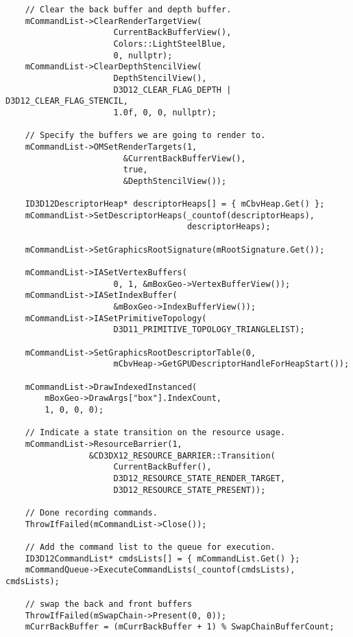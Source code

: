 \begin{lstlisting}
    // Clear the back buffer and depth buffer.
    mCommandList->ClearRenderTargetView(
                      CurrentBackBufferView(), 
                      Colors::LightSteelBlue, 
                      0, nullptr);
    mCommandList->ClearDepthStencilView(
                      DepthStencilView(), 
                      D3D12_CLEAR_FLAG_DEPTH | D3D12_CLEAR_FLAG_STENCIL, 
                      1.0f, 0, 0, nullptr);
    
    // Specify the buffers we are going to render to.
    mCommandList->OMSetRenderTargets(1, 
                        &CurrentBackBufferView(), 
                        true, 
                        &DepthStencilView());

    ID3D12DescriptorHeap* descriptorHeaps[] = { mCbvHeap.Get() };
    mCommandList->SetDescriptorHeaps(_countof(descriptorHeaps), 
                                     descriptorHeaps);

    mCommandList->SetGraphicsRootSignature(mRootSignature.Get());

    mCommandList->IASetVertexBuffers(
                      0, 1, &mBoxGeo->VertexBufferView());
    mCommandList->IASetIndexBuffer(
                      &mBoxGeo->IndexBufferView());
    mCommandList->IASetPrimitiveTopology(
                      D3D11_PRIMITIVE_TOPOLOGY_TRIANGLELIST);
    
    mCommandList->SetGraphicsRootDescriptorTable(0, 
                      mCbvHeap->GetGPUDescriptorHandleForHeapStart());

    mCommandList->DrawIndexedInstanced(
        mBoxGeo->DrawArgs["box"].IndexCount, 
        1, 0, 0, 0);
    
    // Indicate a state transition on the resource usage.
    mCommandList->ResourceBarrier(1, 
                 &CD3DX12_RESOURCE_BARRIER::Transition(
                      CurrentBackBuffer(),
                      D3D12_RESOURCE_STATE_RENDER_TARGET, 
                      D3D12_RESOURCE_STATE_PRESENT));

    // Done recording commands.
    ThrowIfFailed(mCommandList->Close());
 
    // Add the command list to the queue for execution.
    ID3D12CommandList* cmdsLists[] = { mCommandList.Get() };
    mCommandQueue->ExecuteCommandLists(_countof(cmdsLists), cmdsLists);
    
    // swap the back and front buffers
    ThrowIfFailed(mSwapChain->Present(0, 0));
    mCurrBackBuffer = (mCurrBackBuffer + 1) % SwapChainBufferCount;


\end{lstlisting}
